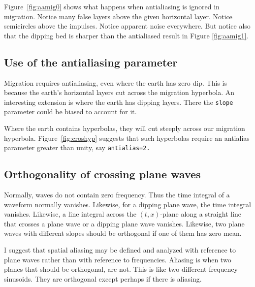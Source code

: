 
Figure~\ref{fig:aamig0} shows what happens when antialiasing
is ignored in migration.
Notice many false layers above the given horizontal layer.
Notice semicircles above the impulses.
Notice apparent noise everywhere.
But notice also that the dipping bed is sharper
than the antialiased result in Figure \ref{fig:aamig1}.

\subsection{Use of the antialiasing parameter}

\par
Migration requires antialiasing, even where the earth has zero dip.
This is because the earth's horizontal layers
cut across the migration hyperbola.
An interesting extension is where the earth has dipping layers.
There the {\tt slope} parameter could be biased to account for it.
\par
Where the earth contains hyperbolas,
they will cut steeply across our migration hyperbola.
Figure~\ref{fig:croshyp} suggests
that such hyperbolas require
an antialias parameter greater than unity, say {\tt antialias=2.}

\subsection{Orthogonality of crossing plane waves}
Normally, waves do not contain zero frequency.
Thus the time integral of a waveform normally vanishes.
Likewise,
for a dipping plane wave, the time integral vanishes.
Likewise,
a line integral
across the $(t,x)$-plane
along a straight line that crosses a plane wave
or a dipping plane wave vanishes.
Likewise,
two plane waves with different slopes should be orthogonal
if one of them has zero mean.

\par
I suggest that spatial aliasing may be defined and analyzed
with reference to plane waves
rather than with reference to frequencies.
Aliasing is when two planes that should be orthogonal, are not.
This is like two different frequency sinusoids.
They are orthogonal except perhaps if there is aliasing.

